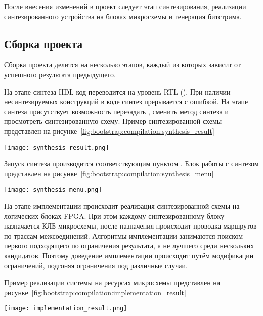 После внесения изменений в проект следует этап синтезирования, реализации
синтезированного устройства на блоках микросхемы и генерация битстрима.

\subsection{Сборка проекта}
\label{sec:bootstrap:compilation}

Сборка проекта делится на несколько этапов, каждый из которых зависит от успешного
результата предыдущего.

На этапе синтеза HDL код переводится на уровень RTL ().
При наличии несинтезируемых конструкций в коде синтез прерывается с ошибкой. На этапе
синтеза присутствует возможность перезадать , сменить метод синтеза и
просмотреть синтезированную схему. Пример синтезированной схемы представлен
на рисунке~\ref{fig:bootstrap:compilation:synthesis_result}

\begin{center}
  \centering
  \texttt{[image: synthesis\_result.png]}
  \label{fig:bootstrap:compilation:synthesis_result}
\end{center}

Запуск синтеза производится соответствующим пунктом . Блок работы с
синтезом представлен на рисунке~\ref{fig:bootstrap:compilation:synthesis_menu}

\begin{center}
  \centering
  \texttt{[image: synthesis\_menu.png]}
  \label{fig:bootstrap:compilation:synthesis_menu}
\end{center}

На этапе имплементации происходит реализация синтезированной схемы на логических блоках FPGA.
При этом каждому синтезированному блоку назначается КЛБ микросхемы, после назначения происходит
проводка маршрутов по трассам межсоединений. Алгоритмы имплементации занимаются поиском первого
подходящего по ограничения результата, а не лучшего среди нескольких кандидатов. Поэтому доведение
имплементации происходит путём модификации ограничений, подгоняя ограничения под различные случаи.

Пример реализации системы на ресурсах микросхемы
представлен на рисунке~\ref{fig:bootstrap:compilation:implementation_result}

\begin{center}
  \centering
  \texttt{[image: implementation\_result.png]}
  \label{fig:bootstrap:compilation:implementation_result}
\end{center}

